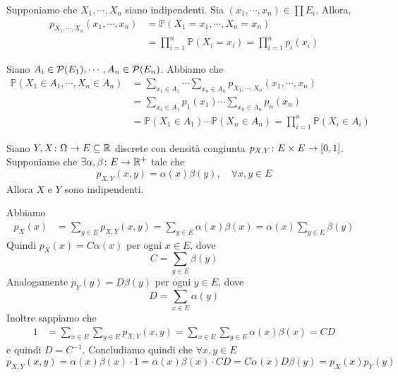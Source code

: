 \documentclass[a4paper]{article}
\begin{document}
\begin{snippetproof}{}
    \begin{iffproof}
    \item Supponiamo che \(X_1, \cdots, X_n\) siano indipendenti.
        Sia \((x_1, \cdots, x_n) \in \prod E_i\). Allora,
        \begin{align*}
            p_{X_1, \cdots, X_n}(x_1, \cdots, x_n)
            &= \mathbb P(X_1 = x_1, \cdots, X_n = x_n) \\
            &= \prod_{i=1}^n \mathbb P(X_i = x_i)
            = \prod_{i=1}^n p_i(x_i)
        \end{align*}
    \item Siano \(A_i \in \mathcal P(E_1), \cdots, A_n \in \mathcal P(E_n)\).
        Abbiamo che
        \begin{align*}
            \mathbb P(X_1 \in A_1, \cdots, X_n \in A_n)
            &= \sum_{x_1 \in A_1}
            \cdots
            \sum_{x_n \in A_n}
            p_{X_1, \cdots, X_n}(x_1, \cdots, x_n) \\
            &= \sum_{x_1 \in A_1} p_1(x_1) \cdots \sum_{x_n \in A_n} p_n(x_n) \\
            &= \mathbb P(X_1 \in A_1) \cdots \mathbb P(X_n \in A_n)
            = \prod_{i=1}^n \mathbb P(X_i \in A_i)
        \end{align*}
    \end{iffproof}
\end{snippetproof}

\begin{snippetproposition}{}
    Siano \(Y,X \colon \Omega \to E \subseteq \mathbb{R}\)
    discrete con densità congiunta
    \(p_{X,Y} \colon E \times E \to [0,1]\).
    Supponiamo che \(\exists \alpha, \beta \colon E \to \mathbb{R}^+\)
    tale che
    \[
        p_{X,Y}(x,y) = \alpha(x)\beta(y), \quad \forall x,y \in E
    \]
    Allora \(X\) e \(Y\) sono indipendenti.
\end{snippetproposition}

\begin{snippetproof}{}
    Abbiamo
    \begin{align*}
        p_X(x) &= \sum_{y \in E} p_{X,Y}(x,y) = \sum_{y \in E} \alpha(x)\beta(x)
        = \alpha(x) \sum_{y\in E} \beta(y)
    \end{align*}
    Quindi \(p_X(x) = C \alpha(x)\) per ogni \(x \in E\),
    dove \[
        C = \sum_{y \in E} \beta(y)
    \]
    Analogamente \(p_Y(y) = D\beta(y)\) per ogni \(y \in E\),
    dove \[
        D = \sum_{x \in E} \alpha(y)
    \]
    Inoltre sappiamo che
    \begin{align*}
        1 &= \sum_{x \in E} \sum_{y \in E} p_{X,Y}(x,y)
        = \sum_{x \in E} \sum_{y \in E} \alpha(x) \beta(x) = CD
    \end{align*}
    e quindi \(D = C^{-1}\).
    Concludiamo quindi che \(\forall x,y \in E\)
    \[
        p_{X,Y}(x,y) = \alpha(x)\beta(x) \cdot 1
        = \alpha(x)\beta(x) \cdot CD = C\alpha(x)D\beta(y)
        = p_X(x)p_Y(y)
    \]
\end{snippetproof}
\end{document}
